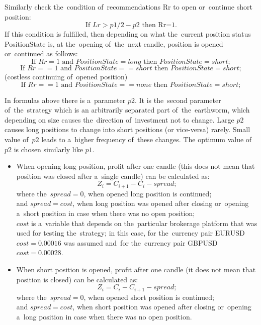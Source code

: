 \documentclass[runningheads,a4paper]{llncs}
\begin{document}
Similarly check the~condition of~recommendations Rr to open or~continue short position:
\begin{equation}
\text{If } Lr>p1/2 - p2 \text { then Rr=1.}
\end{equation}
If this condition is fulfilled, then depending on what the~current position status PositionState is, at the~opening of~the~next candle, position is opened or~continued as follows: \\
\begin{equation}
\text{If } Rr=1 \text{ and~} PositionState =long \text{ then } PositionState =short;
\end{equation}
\begin{equation}
\text{If } Rr==1 \text{ and~} PositionState ==short \text{ then } PositionState=short;
\end{equation}
(costless continuing of~opened position)
\begin{equation}
\text{If } Rr==1 \text{ and~}  PositionState ==none \text{ then }  PositionState =short;
\end{equation}

In formulas above there is a~parameter $p2$. It is the~second parameter of~the~strategy which is an arbitrarily separated part of~the~earthworm, which depending on size causes the~direction of~investment not to change. Large $p2$ causes long positions to change into short positions (or vice-versa) rarely. Small value of~$p2$ leads to a~higher frequency of~these changes. The optimum value of~$p2$ is chosen similarly like $p1$.
\begin{itemize}
\item 	When opening long position, profit after one candle (this does not mean that position was closed after a~single candle) can be calculated as:
\begin{equation}
Z_i = C_{i+1} - C_i - spread;
\end{equation}
where the~$spread = 0$, when opened long position is continued; \\
and $spread = cost$, when long position was opened after closing or~opening a~short position in case when there was no open position;\\
$cost$ is a~variable that depends on the~particular brokerage platform that was used for testing the~strategy; in this case, for the~currency pair EURUSD $cost = 0.00016$ was assumed and~for the~currency pair GBPUSD $cost = 0.00028$.
\item When short position is opened, profit after one candle (it does not mean that position is closed) can be calculated as: 
\begin{equation}
Z_i = C_i-C_{i+1}- spread;
\end{equation}
where the~$spread = 0$, when opened short position is continued;\\ 
and $spread = cost$, when short position was opened after closing or~opening a~long position in case when there was no open position.
\end{itemize}
\end{document}
